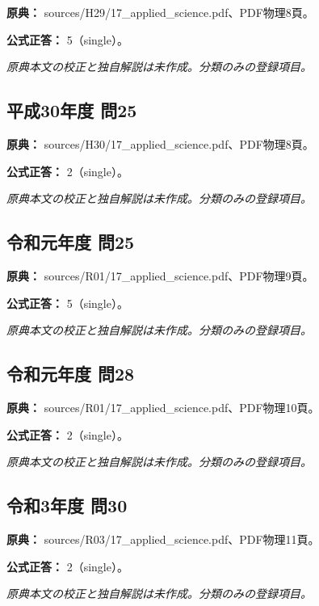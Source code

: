 \noindent\textbf{原典：} sources/H29/17\_applied\_science.pdf、PDF物理8頁。

\textbf{公式正答：} 5（single）。

\par\textit{原典本文の校正と独自解説は未作成。分類のみの登録項目。}

\subsection{平成30年度 問25}
\label{q:h30-reg-applied-25}

\noindent\textbf{原典：} sources/H30/17\_applied\_science.pdf、PDF物理8頁。

\textbf{公式正答：} 2（single）。

\par\textit{原典本文の校正と独自解説は未作成。分類のみの登録項目。}

\subsection{令和元年度 問25}
\label{q:r01-reg-applied-25}

\noindent\textbf{原典：} sources/R01/17\_applied\_science.pdf、PDF物理9頁。

\textbf{公式正答：} 5（single）。

\par\textit{原典本文の校正と独自解説は未作成。分類のみの登録項目。}

\subsection{令和元年度 問28}
\label{q:r01-reg-applied-28}

\noindent\textbf{原典：} sources/R01/17\_applied\_science.pdf、PDF物理10頁。

\textbf{公式正答：} 2（single）。

\par\textit{原典本文の校正と独自解説は未作成。分類のみの登録項目。}

\subsection{令和3年度 問30}
\label{q:r03-reg-applied-30}

\noindent\textbf{原典：} sources/R03/17\_applied\_science.pdf、PDF物理11頁。

\textbf{公式正答：} 2（single）。

\par\textit{原典本文の校正と独自解説は未作成。分類のみの登録項目。}

